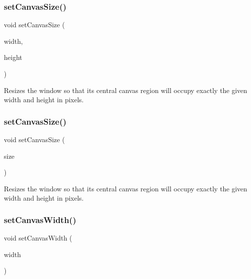 \subsubsection{\texorpdfstring{set\+Canvas\+Size()}{setCanvasSize()}\hspace{0.1cm}{\footnotesize\ttfamily [1/2]}}
{\footnotesize\ttfamily void set\+Canvas\+Size (\begin{DoxyParamCaption}\item[{double}]{width,  }\item[{double}]{height }\end{DoxyParamCaption})\hspace{0.3cm}{\ttfamily [virtual]}}



Resizes the window so that its central canvas region will occupy exactly the given width and height in pixels. 

\mbox{\label{classGWindow_a22f0f065a223a3c0ae5173316ece1dc1}} 
\subsubsection{\texorpdfstring{set\+Canvas\+Size()}{setCanvasSize()}\hspace{0.1cm}{\footnotesize\ttfamily [2/2]}}
{\footnotesize\ttfamily void set\+Canvas\+Size (\begin{DoxyParamCaption}\item[{const \mbox{\hyperlink{classGDimension}{G\+Dimension}} \&}]{size }\end{DoxyParamCaption})\hspace{0.3cm}{\ttfamily [virtual]}}



Resizes the window so that its central canvas region will occupy exactly the given width and height in pixels. 

\mbox{\label{classGWindow_a455beafcfc20a2b7d9ac00499e222f0f}} 
\subsubsection{\texorpdfstring{set\+Canvas\+Width()}{setCanvasWidth()}}
{\footnotesize\ttfamily void set\+Canvas\+Width (\begin{DoxyParamCaption}\item[{double}]{width }\end{DoxyParamCaption})\hspace{0.3cm}{\ttfamily [virtual]}}



